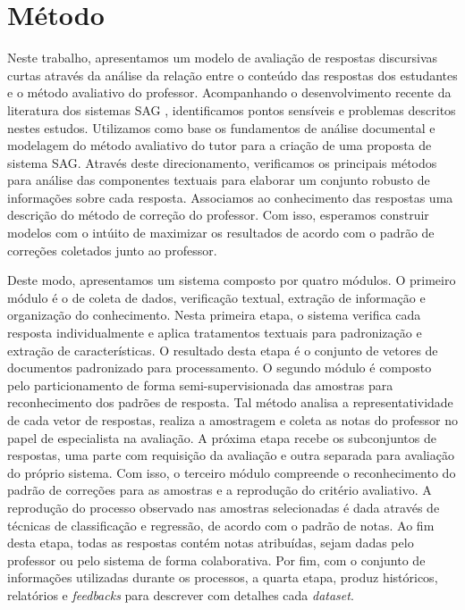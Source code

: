 \chapter{Método}
\label{cap-metodo}

Neste trabalho, apresentamos um modelo de avaliação de respostas discursivas curtas através da análise da relação entre o conteúdo das respostas dos estudantes e o método avaliativo do professor. Acompanhando o desenvolvimento recente da literatura dos sistemas SAG \cite{burrows2015}, identificamos pontos sensíveis e problemas descritos nestes estudos. Utilizamos como base os fundamentos de análise documental e modelagem do método avaliativo do tutor para a criação de uma proposta de sistema SAG. Através deste direcionamento, verificamos os principais métodos para análise das componentes textuais para elaborar um conjunto robusto de informações sobre cada resposta. Associamos ao conhecimento das respostas uma descrição do método de correção do professor. Com isso, esperamos construir modelos com o intúito de maximizar os resultados de acordo com o padrão de correções coletados junto ao professor.

Deste modo, apresentamos um sistema composto por quatro módulos. O primeiro módulo é o de coleta de dados, verificação textual, extração de informação e organização do conhecimento. Nesta primeira etapa, o sistema verifica cada resposta individualmente e aplica tratamentos textuais para padronização e extração de características. O resultado desta etapa é o conjunto de vetores de documentos padronizado para processamento. O segundo módulo é composto pelo particionamento de forma semi-supervisionada das amostras para reconhecimento dos padrões de resposta. Tal método analisa a representatividade de cada vetor de respostas, realiza a amostragem e coleta as notas do professor no papel de especialista na avaliação. A próxima etapa recebe os subconjuntos de respostas, uma parte com requisição da avaliação e outra separada para avaliação do próprio sistema. Com isso, o terceiro módulo compreende o reconhecimento do padrão de correções para as amostras e a reprodução do critério avaliativo. A reprodução do processo observado nas amostras selecionadas é dada através de técnicas de classificação e regressão, de acordo com o padrão de notas. Ao fim desta etapa, todas as respostas contém notas atribuídas, sejam dadas pelo professor ou pelo sistema de forma colaborativa. Por fim, com o conjunto de informações utilizadas durante os processos, a quarta etapa, produz históricos, relatórios e \textit{feedbacks} para descrever com detalhes cada \textit{dataset}.

